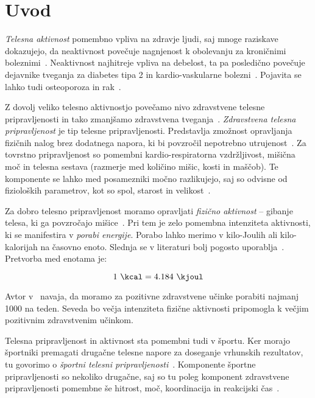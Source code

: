 \chapter{Uvod} \label{uvod}
\emph{Telesna aktivnost} pomembno vpliva na zdravje ljudi, saj mnoge raziskave dokazujejo, da neaktivnost povečuje nagnjenost k obolevanju za kroničnimi boleznimi~\cite{warburton2006health}. Neaktivnost najhitreje vpliva na debelost, ta pa posledično povečuje dejavnike tveganja za diabetes tipa 2 in kardio-vaskularne bolezni~\cite{bassuk2005epidemiological}. Pojavita se lahko tudi osteoporoza in rak~\cite{warburton2006health}. 

Z dovolj veliko telesno aktivnostjo povečamo nivo zdravstvene telesne pripravljenosti in tako zmanjšamo zdravstvena tveganja~\cite{caspersen1985physical}. \emph{Zdravstvena telesna pripravljenost} je tip telesne pripravljenosti. Predstavlja zmožnost opravljanja fizičnih nalog brez dodatnega napora, ki bi povzročil nepotrebno utrujenost~\cite{caspersen1985physical}. Za tovrstno pripravljenost so pomembni kardio-respiratorna vzdržljivost, mišična moč in telesna sestava (razmerje med količino mišic, kosti in maščob). Te komponente se lahko med posamezniki močno razlikujejo, saj so odvisne od fizioloških parametrov, kot so spol, starost in velikost~\cite{caspersen1985physical}.

Za dobro telesno pripravljenost moramo opravljati \emph{fizično aktivnost} -- gibanje telesa, ki ga povzročajo mišice~\cite{caspersen1985physical}. Pri tem je zelo pomembna intenziteta aktivnosti, ki se manifestira v \emph{porabi energije}. Porabo lahko merimo v kilo-Joulih ali kilo-kalorijah na časovno enoto. Slednja se v literaturi bolj pogosto uporablja~\cite{caspersen1985physical}. Pretvorba med enotama je: 

\begin{equation} \label{eq:pretvorba}
	1~\mathrm{\si{\kcal}} = \num{4.184}~\mathrm{\si{\kjoul}}
\end{equation}


Avtor v~\cite{warburton2006health} navaja, da moramo za pozitivne zdravstvene učinke porabiti najmanj \SI{1000}{\kcal} na teden. Seveda bo večja intenziteta fizične aktivnosti pripomogla k večjim pozitivnim zdravstvenim učinkom.

Telesna pripravljenost in aktivnost sta pomembni tudi v športu. Ker morajo športniki premagati drugačne telesne napore za doseganje vrhunskih rezultatov, tu govorimo o \emph{športni telesni pripravljenosti}~\cite{caspersen1985physical}. Komponente športne pripravljenosti so nekoliko drugačne, saj so tu poleg komponent zdravstvene pripravljenosti pomembne še hitrost, moč, koordinacija in reakcijski čas~\cite{caspersen1985physical}.

